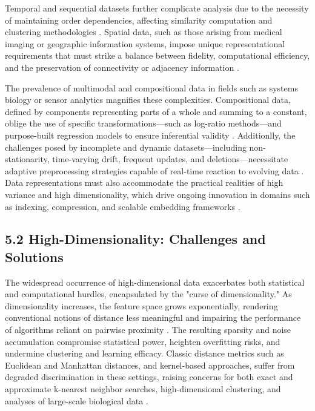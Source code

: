 \documentclass[11pt]{article}
\begin{document}
Temporal and sequential datasets further complicate analysis due to the necessity of maintaining order dependencies, affecting similarity computation and clustering methodologies \cite{ref64,ref65}. Spatial data, such as those arising from medical imaging or geographic information systems, impose unique representational requirements that must strike a balance between fidelity, computational efficiency, and the preservation of connectivity or adjacency information \cite{ref67,ref68,ref69,ref70}.

The prevalence of multimodal and compositional data in fields such as systems biology or sensor analytics magnifies these complexities. Compositional data, defined by components representing parts of a whole and summing to a constant, oblige the use of specific transformations—such as log-ratio methods—and purpose-built regression models to ensure inferential validity \cite{ref90,ref92,ref94}. Additionlly, the challenges posed by incomplete and dynamic datasets—including non-stationarity, time-varying drift, frequent updates, and deletions—necessitate adaptive preprocessing strategies capable of real-time reaction to evolving data \cite{ref66,ref70,ref76,ref77,ref78,ref86}. Data representations must also accommodate the practical realities of high variance and high dimensionality, which drive ongoing innovation in domains such as indexing, compression, and scalable embedding frameworks \cite{ref69,ref70,ref78,ref86,ref90}.

\subsection{5.2 High-Dimensionality: Challenges and Solutions}

The widespread occurrence of high-dimensional data exacerbates both statistical and computational hurdles, encapsulated by the "curse of dimensionality." As dimensionality increases, the feature space grows exponentially, rendering conventional notions of distance less meaningful and impairing the performance of algorithms reliant on pairwise proximity \cite{ref64,ref65}. The resulting sparsity and noise accumulation compromise statistical power, heighten overfitting risks, and undermine clustering and learning efficacy. Classic distance metrics such as Euclidean and Manhattan distances, and kernel-based approaches, suffer from degraded discrimination in these settings, raising concerns for both exact and approximate k-nearest neighbor searches, high-dimensional clustering, and analyses of large-scale biological data \cite{ref72,ref73,ref93,ref110,ref116}.
\end{document}
